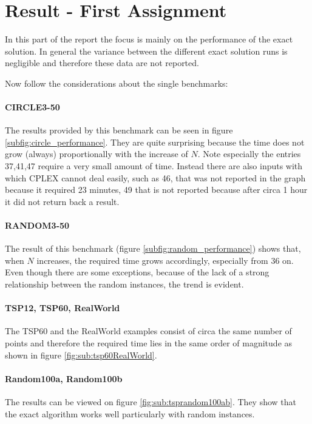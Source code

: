 \section{Result - First Assignment}
In this part of the report the focus is mainly  on the performance of the exact solution. 
In general the variance between the different exact solution runs
is negligible and therefore these data are not reported.

Now follow the considerations about the single benchmarks:

\paragraph{CIRCLE3-50}
The results provided by this benchmark can be seen in figure \ref{subfig:circle_performance}. They are quite surprising because
the time does not grow (always) proportionally with the increase of $N$.
Note especially the entries 37,41,47 require a very small amount of time. Instead
there are also inputs with which CPLEX cannot deal easily, such as 46, that was not reported in the graph because it required 23 minutes,
49 that is not reported because after circa 1 hour it did not return back a result.

\paragraph{RANDOM3-50}
The result of this benchmark (figure \ref{subfig:random_performance}) shows that, when $N$ increases, the required time 
grows accordingly, especially from $36$ on.
Even though there are some exceptions, because of the
lack of a strong relationship between the random instances, the trend is evident.

\paragraph{TSP12, TSP60, RealWorld}
The TSP60 and the RealWorld examples consist of circa the same number of points and
therefore the required  time lies in the same order of magnitude as shown in figure
\ref{fig:sub:tsp60RealWorld}.

\paragraph{Random100a, Random100b}
The results can be viewed on figure \ref{fig:sub:tsprandom100ab}. They show that 
the exact algorithm works well particularly with random instances.

